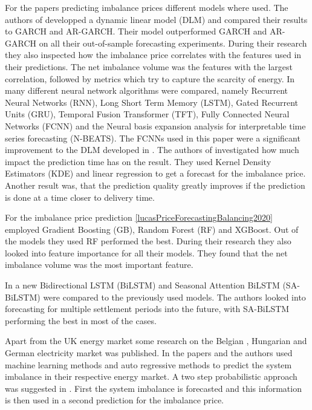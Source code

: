 \documentclass[class=scrbook, crop=false]{standalone}
\begin{document}
For the papers predicting imbalance prices different models where used.
The authors of \cite{limaBayesianPredictiveDistributions2023} developped a dynamic linear model (DLM) and compared their results to GARCH and AR-GARCH. Their model outperformed GARCH and AR-GARCH on all their out-of-sample forecasting experiments. During their research they also inspected how the imbalance price correlates with the features used in their predictions.
The net imbalance volume was the features with the largest correlation, followed by metrics which try to capture the scarcity of energy.
In \cite{ganeshForecastingImbalancePrice2024} many different neural network algorithms were compared, namely Recurrent Neural Networks (RNN), Long Short Term Memory (LSTM), Gated Recurrent Units (GRU), Temporal Fusion Transformer (TFT), Fully Connected Neural Networks (FCNN) and the Neural basis expansion analysis for interpretable time series forecasting (N-BEATS). The FCNNs used in this paper were a significant improvement to the DLM developed in \cite{limaBayesianPredictiveDistributions2023}.
The authors of \cite{browellPredictingElectricityImbalance2022} investigated how much impact the prediction time has on the result. They used Kernel Density Estimators (KDE) and linear regression to get a forecast for the imbalance price. Another result was, that the prediction quality greatly improves if the prediction is done at a time closer to delivery time.
 
 For the imbalance price prediction \ref{lucasPriceForecastingBalancing2020} employed Gradient Boosting (GB), Random Forest (RF) and XGBoost. Out of the models they used RF performed the best. During their research they also looked into feature importance for all their models. They found that the net imbalance volume was the most important feature.
 
 In \cite{dengSeasonalityDeepLearning2024} a new Bidirectional LSTM (BiLSTM) and Seasonal Attention BiLSTM (SA-BiLSTM) were compared to the previously used models. The authors looked into forecasting for multiple settlement periods into the future, with SA-BiLSTM performing the best in most of the cases.
 
Apart from the UK energy market some research on the Belgian \cite{bottieauVeryShortTermProbabilisticForecasting2020} \cite{dumasProbabilisticForecastingImbalance2019}, Hungarian \cite{balazsShorttermSystemImbalance2024} and German \cite{narajewskiProbabilisticForecastingGerman2022} electricity market was published.
In the papers \cite{bottieauVeryShortTermProbabilisticForecasting2020} and \cite{balazsShorttermSystemImbalance2024} the authors used machine learning methods and auto regressive methods to predict the system imbalance in their respective energy market.
A two step probabilistic approach was suggested in \cite{dumasProbabilisticForecastingImbalance2019}. First the system imbalance is forecasted and this information is then used in a second prediction for the imbalance price.
\end{document}
